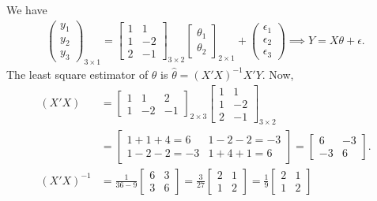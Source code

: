\documentclass[addpoints,answers,a4paper,11pt]{exam}
\begin{document}
\begin{questions}
   \begin{solution}
      We have
      \begin{align*}
         \begin{pmatrix} y_1 \\ y_2 \\ y_3 \end{pmatrix}_{3 \times
         1} = \begin{bmatrix} 1 & 1 \\ 1 & -2 \\ 2 & -1 \end{bmatrix}_{3 \times 2}
         \begin{bmatrix} \theta_1 \\ \theta_2 \end{bmatrix}_{2 \times 1} +
         \begin{pmatrix} \epsilon_1 \\ \epsilon_2 \\ \epsilon_3 \end{pmatrix} 
         \implies
         Y = X\theta + \epsilon.
      \end{align*}
      The least square estimator of $\theta$ is $ \hat{\theta} = (X'X)^{-1}X'Y$.
      Now,
      \begin{align*}
         (X'X) &= \begin{bmatrix} 1 & 1 & 2 \\ 1 & -2 & -1 \end{bmatrix}_{2
         \times 3} \begin{bmatrix} 1 & 1 \\ 1 & -2 \\ 2 & -1 \end{bmatrix}_{3
         \times 2} \\
         &= \begin{bmatrix} 1+1+4=6 & 1-2-2=-3 \\ 1-2-2=-3 & 1+4+1=6
         \end{bmatrix} = \begin{bmatrix} 6 & -3 \\ -3 & 6 \end{bmatrix}. \\
         (X'X)^{-1} &= \frac{1}{36 - 9} \begin{bmatrix} 6 & 3 \\ 3 & 6
         \end{bmatrix} = \frac{3}{27} \begin{bmatrix} 2 & 1 \\ 1 & 2
         \end{bmatrix} = \frac{1}{9} \begin{bmatrix} 2 & 1 \\ 1 & 2 \end{bmatrix}

\end{align*}
\end{solution}
\end{questions}
\end{document}
